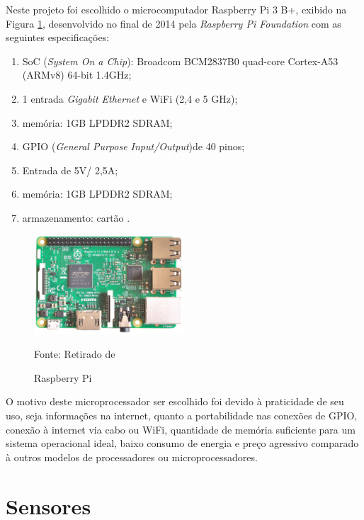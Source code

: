 \documentclass[../../layout.tex]{subfiles}
\begin{document}
\hspace*{3em}Neste projeto foi escolhido o microcomputador Raspberry Pi 3 B+, exibido na Figura \ref{fig:rpi}, desenvolvido no final de 2014 pela \emph{Raspberry Pi Foundation} com as seguintes especificações:
\begin{enumerate}[label=\alph*)]
\itemsep0em
    \item SoC (\emph{System On a Chip}): Broadcom BCM2837B0 quad-core Cortex-A53 (ARMv8) 64-bit 1.4GHz;
    \item 1 entrada \emph{Gigabit Ethernet} e WiFi (2,4 e 5 GHz);
    \item memória: 1GB LPDDR2 SDRAM;
    \item GPIO (\emph{General Purpose Input/Output})de 40 pinos;
    \item Entrada de 5V/ 2,5A;
    \item memória: 1GB LPDDR2 SDRAM;
    \item armazenamento: cartão .
\end{enumerate}

\begin{figure}[H]
\centering
\caption{Raspberry Pi}
\includegraphics[width=0.5\textwidth]{assets/static/img/rpi.jpg}
\label{fig:rpi}

\begin{minipage}{0.5\textwidth}
\raggedright \footnotesize Fonte: Retirado de 
\end{minipage}
\end{figure}

\hspace*{3em}O motivo deste microprocessador ser escolhido foi devido à praticidade de seu uso, seja informações na internet, quanto a portabilidade nas conexões de GPIO, conexão à internet via cabo ou WiFi, quantidade de memória suficiente para um sistema operacional ideal, baixo consumo de energia e preço agressivo comparado à outros modelos de processadores ou microprocessadores.

\section{Sensores}
\end{document}
